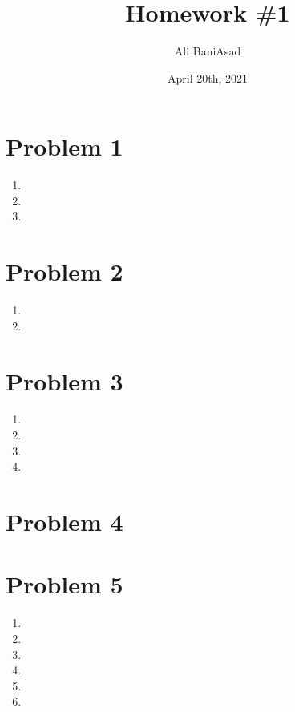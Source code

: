 \documentclass[12]{fphw}
\title{Homework \#1} %
\author{Ali BaniAsad} %
\date{April 20th, 2021} %
\institute{Sharif University of Technology \\ Institute of Aerospace} %
\begin{document}
\maketitle %
\section*{Problem 1}
\begin{enumerate}[label=(\alph*)]
	\item 
	
	\newpage
	\item 
	
	\newpage
	\item 
	
\end{enumerate}
\newpage
\section*{Problem 2}

\begin{enumerate}[label=(\alph*)]
	\item 
	
	\item 
	
\end{enumerate}


\newpage
\section*{Problem 3}

\begin{enumerate}[label=(\alph*)]
	\item 
	
	\item 
	
	\item 
	
	\item 
	
\end{enumerate}
\section*{Problem 4}

\section*{Problem 5}
\begin{enumerate}[label=(\alph*)]
	\item 
	
	\item
		
	\item 
	
	\item 
	
	\item 
	
	\item 
	
\end{enumerate}
\end{document}
